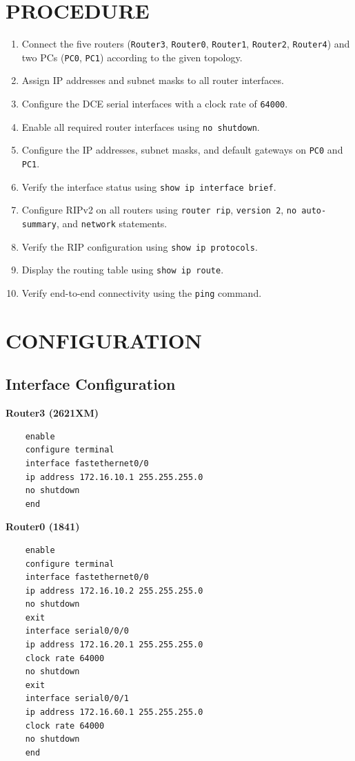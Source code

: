 \documentclass[12pt,a4paper]{article}
\begin{document}
\section*{PROCEDURE}
\begin{enumerate}
	\item Connect the five routers (\texttt{Router3}, \texttt{Router0}, \texttt{Router1}, \texttt{Router2}, \texttt{Router4}) and two PCs (\texttt{PC0}, \texttt{PC1}) according to the given topology.
	\item Assign IP addresses and subnet masks to all router interfaces.
	\item Configure the DCE serial interfaces with a clock rate of \texttt{64000}.
	\item Enable all required router interfaces using \texttt{no shutdown}.
	\item Configure the IP addresses, subnet masks, and default gateways on \texttt{PC0} and \texttt{PC1}.
	\item Verify the interface status using \texttt{show ip interface brief}.
	\item Configure RIPv2 on all routers using \texttt{router rip}, \texttt{version 2}, \texttt{no auto-summary}, and \texttt{network} statements.
	\item Verify the RIP configuration using \texttt{show ip protocols}.
	\item Display the routing table using \texttt{show ip route}.
	\item Verify end-to-end connectivity using the \texttt{ping} command.
\end{enumerate}

\section*{CONFIGURATION}

\subsection*{Interface Configuration}
\textbf{Router3 (2621XM)}
\begin{lstlisting}
	enable
	configure terminal
	interface fastethernet0/0
	ip address 172.16.10.1 255.255.255.0
	no shutdown
	end
\end{lstlisting}

\textbf{Router0 (1841)}
\begin{lstlisting}
	enable
	configure terminal
	interface fastethernet0/0
	ip address 172.16.10.2 255.255.255.0
	no shutdown
	exit
	interface serial0/0/0
	ip address 172.16.20.1 255.255.255.0
	clock rate 64000
	no shutdown
	exit
	interface serial0/0/1
	ip address 172.16.60.1 255.255.255.0
	clock rate 64000
	no shutdown
	end
\end{lstlisting}
\end{document}
